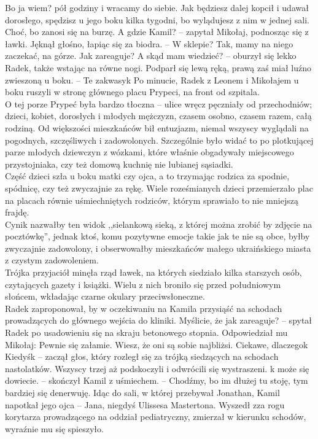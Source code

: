 \documentclass[../MAIN.tex]{subfiles}
\begin{document}
\xx Bo ja wiem? pół godziny i wracamy do siebie.
\xx Jak będziesz dalej kopcił i udawał dorosłego, spędzisz u jego boku kilka tygodni, bo wylądujesz z nim w jednej sali. Choć, bo zanosi się na burzę.
\xx A gdzie Kamil? -- zapytał Mikołaj, podnosząc się z ławki. Jęknął głośno, łapiąc się za biodra. -- W sklepie?
\xx Tak, mamy na niego zaczekać, na górze.
\xx Jak zareaguje?
\xx A skąd mam wiedzieć? -- oburzył się lekko Radek, także wstając na równe nogi. Podparł się lewą ręką, prawą zaś miał luźno zwieszoną u boku. -- Te zakwasy\3k
\qd
Po minucie, Radek z Leonem i Mikołajem u boku ruszyli w stronę głównego placu Prypeci, na front od szpitala.\\
O tej porze Prypeć była bardzo tłoczna -- ulice wręcz pęczniały od przechodniów; dzieci, kobiet, dorosłych i młodych mężczyzn, czasem osobno, czasem razem, całą rodziną. Od większości mieszkańców bił entuzjazm, niemal wszyscy wyglądali na pogodnych, szczęśliwych i zadowolonych. Szczególnie było widać to po plotkującej parze młodych dziewczyn z wózkami, które właśnie obgadywały miejscowego przystojniaka, czy też domową kuchnię nie lubianej sąsiadki.\\
Część dzieci szła u boku matki czy ojca, a to trzymając rodzica za spodnie, spódnicę, czy też zwyczajnie za rękę. Wiele roześmianych dzieci przemierzało plac na placach równie uśmiechniętych rodziców, którym sprawiało to nie mniejszą frajdę.\\
Cynik nazwałby ten widok ,,sielankową sieką, z której można zrobić by zdjęcie na pocztówkę'', jednak ktoś, komu pozytywne emocje takie jak te nie są obce, byłby zwyczajnie zadowolony, i obserwowałby mieszkańców małego ukraińskiego miasta z czystym zadowoleniem.\\
Trójka przyjaciół minęła rząd ławek, na których siedziało kilka starszych osób, czytających gazety i książki. Wielu z nich broniło się przed południowym słońcem, wkładając czarne okulary przeciwsłoneczne.\\
Radek zaproponował, by w oczekiwaniu na Kamila przysiąść na schodach prowadzących do głównego wejścia do kliniki.
\sx Myślicie, że jak zareaguje? -- spytał Radek po usadowieniu się na skraju betonowego stopnia. Odpowiedział mu Mikołaj:
\xx Pewnie się załamie. Wiesz, że oni są sobie najbliżsi.
\xx Ciekawe, dlaczego\3k
\xx Kiedyś\3k -- zaczął głos, który rozległ się za trójką siedzących na schodach nastolatków. Wszyscy trzej aż podskoczyli i odwrócili się wystraszeni.
\xx \3k może się dowiecie. -- skończył Kamil z uśmiechem. -- Chodźmy, bo im dłużej tu stoję, tym bardziej się denerwuję.
\qd
% 
% 
% 
Idąc do sali, w której przebywał Jonathan, Kamil napotkał jego ojca -- Jana, niegdyś Ulissesa Mastertona. Wyszedł zza rogu korytarza prowadzącego na oddział pediatryczny, zmierzał w kierunku schodów, wyraźnie mu się spieszyło.
\end{document}
